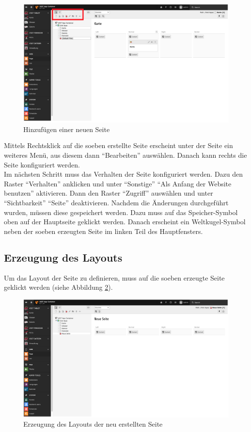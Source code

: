\begin{figure}[ht!]
\centering
\includegraphics[width=12cm]{Figures/paula/typo3/neue_seite_hinzufuegen.png}
\caption{Hinzufügen einer neuen Seite}
\label{img:neue_seite_hinzufuegen}
\end{figure}

Mittels Rechtsklick auf die soeben erstellte Seite erscheint unter der Seite ein weiteres Menü, aus diesem dann “Bearbeiten” auswählen. Danach kann rechts die Seite konfiguriert werden.\\
Im nächsten Schritt muss das Verhalten der Seite konfiguriert werden. Dazu den Raster “Verhalten” anklicken und unter “Sonstige” “Als Anfang der Website benutzen” aktivieren.
Dann den Raster “Zugriff” auswählen und unter “Sichtbarkeit” “Seite” deaktivieren.
Nachdem die Änderungen durchgeführt wurden, müssen diese gespeichert werden. Dazu muss auf das Speicher-Symbol oben auf der Hauptseite geklickt werden. Danach erscheint ein Weltkugel-Symbol neben der soeben erzeugten Seite im linken Teil des Hauptfensters.

\subsection{Erzeugung des Layouts}

Um das Layout der Seite zu definieren, muss auf die soeben erzeugte Seite geklickt werden (siehe Abbildung \ref{img:layout_erzeugung}).

\begin{figure}[ht!]
\centering
\includegraphics[width=12cm]{Figures/paula/typo3/layout_erzeugung.png}
\caption{Erzeugung des Layouts der neu erstellten Seite}
\label{img:layout_erzeugung}
\end{figure}

